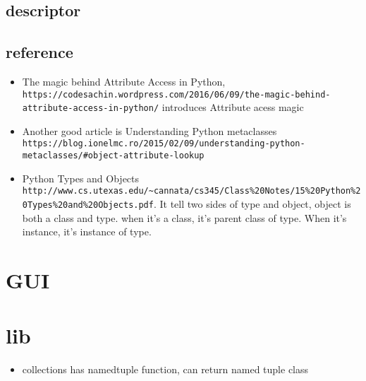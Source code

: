 \documentclass[a4paper,12pt,twoside]{book}
\begin{document}
\section{descriptor}
\section{reference}
\begin{itemize}
	\item The magic behind Attribute Access in Python, \verb|https://codesachin.wordpress.com/2016/06/09/the-magic-behind-attribute-access-in-python/|
	introduces Attribute acess magic
	\item Another good article is  Understanding Python metaclasses \verb|https://blog.ionelmc.ro/2015/02/09/understanding-python-metaclasses/#object-attribute-lookup|
	\item Python Types and Objects \verb|http://www.cs.utexas.edu/~cannata/cs345/Class%20Notes/15%20Python%20Types%20and%20Objects.pdf|. It tell two sides of type and object,  object is both a class and type. when it's a class, it's parent class of type. When it's instance, it's instance of type. 
\end{itemize}
\chapter{GUI}

\chapter{lib}
\begin{itemize}
	\item collections has namedtuple function, can return named tuple class
\end{itemize}




%
\end{document}
